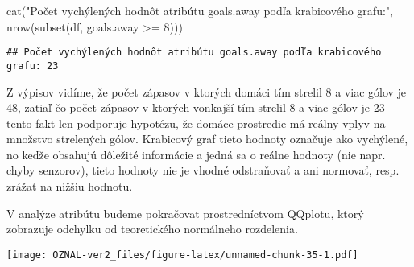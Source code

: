 \documentclass[
]{article}
\newenvironment{Shaded}{\begin{snugshade}}{\end{snugshade}}
\newcommand{\AttributeTok}[1]{\textcolor[rgb]{0.77,0.63,0.00}{#1}}
\newcommand{\DecValTok}[1]{\textcolor[rgb]{0.00,0.00,0.81}{#1}}
\newcommand{\FunctionTok}[1]{\textcolor[rgb]{0.00,0.00,0.00}{#1}}
\newcommand{\NormalTok}[1]{#1}
\newcommand{\SpecialCharTok}[1]{\textcolor[rgb]{0.00,0.00,0.00}{#1}}
\newcommand{\StringTok}[1]{\textcolor[rgb]{0.31,0.60,0.02}{#1}}
\begin{document}
\begin{Shaded}
\begin{Highlighting}[]
\FunctionTok{cat}\NormalTok{(}\StringTok{"Počet vychýlených hodnôt atribútu goals.away podľa krabicového grafu:"}\NormalTok{, }\FunctionTok{nrow}\NormalTok{(}\FunctionTok{subset}\NormalTok{(df, goals.away }\SpecialCharTok{\textgreater{}=} \DecValTok{8}\NormalTok{)))}
\end{Highlighting}
\end{Shaded}

\begin{verbatim}
## Počet vychýlených hodnôt atribútu goals.away podľa krabicového grafu: 23
\end{verbatim}

Z výpisov vidíme, že počet zápasov v ktorých domáci tím strelil 8 a viac
gólov je 48, zatiaľ čo počet zápasov v ktorých vonkajší tím strelil 8 a
viac gólov je 23 - tento fakt len podporuje hypotézu, že domáce
prostredie má reálny vplyv na množstvo strelených gólov. Krabicový graf
tieto hodnoty označuje ako vychýlené, no keďže obsahujú dôležité
informácie a jedná sa o reálne hodnoty (nie napr. chyby senzorov), tieto
hodnoty nie je vhodné odstraňovať a ani normovať, resp. zrážat na nižšiu
hodnotu.

V analýze atribútu budeme pokračovat prostredníctvom QQplotu, ktorý
zobrazuje odchylku od teoretického normálneho rozdelenia.

\begin{Shaded}
\end{Shaded}

\texttt{[image: OZNAL-ver2\_files/figure-latex/unnamed-chunk-35-1.pdf]}

\begin{Shaded}
\end{Shaded}
\end{document}
